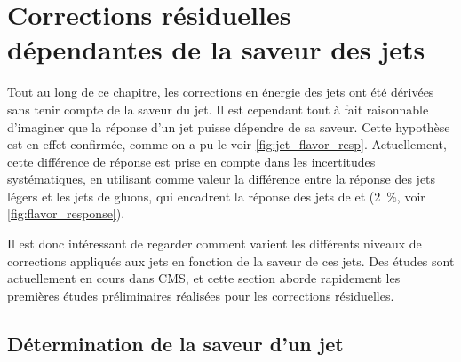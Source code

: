 \section{Corrections résiduelles dépendantes de la saveur des jets}

Tout au long de ce chapitre, les corrections en énergie des jets ont été dérivées sans tenir compte de la saveur du jet. Il est cependant tout à fait raisonnable d'imaginer que la réponse d'un jet puisse dépendre de sa saveur. Cette hypothèse est en effet confirmée, comme on a pu le voir \cref{fig:jet_flavor_resp}. Actuellement, cette différence de réponse est prise en compte dans les incertitudes systématiques, en utilisant comme valeur la différence entre la réponse des jets légers et les jets de gluons, qui encadrent la réponse des jets de \Pcharm et \Pbottom (\tilde\SI{2}{\percent}, voir \cref{fig:flavor_response}).

Il est donc intéressant de regarder comment varient les différents niveaux de corrections appliqués aux jets en fonction de la saveur de ces jets. Des études sont actuellement en cours dans CMS, et cette section aborde rapidement les premières études préliminaires réalisées pour les corrections résiduelles.

\subsection{Détermination de la saveur d'un jet}

